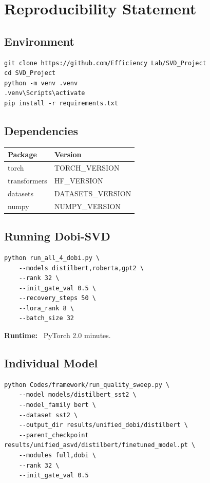
\section{Reproducibility Statement}

\subsection{Environment}

\begin{lstlisting}
git clone https://github.com/Efficiency Lab/SVD_Project
cd SVD_Project
python -m venv .venv
.venv\Scripts\activate
pip install -r requirements.txt
\end{lstlisting}

\subsection{Dependencies}

\begin{table}[H]
\centering
\small
\begin{tabular}{ll}
\toprule
\textbf{Package} & \textbf{Version} \\
\midrule
torch & {{TORCH\_VERSION}} \\
transformers & {{HF\_VERSION}} \\
datasets & {{DATASETS\_VERSION}} \\
numpy & {{NUMPY\_VERSION}} \\
\bottomrule
\end{tabular}
\end{table}

\subsection{Running Dobi-SVD}

\begin{lstlisting}
python run_all_4_dobi.py \
    --models distilbert,roberta,gpt2 \
    --rank 32 \
    --init_gate_val 0.5 \
    --recovery_steps 50 \
    --lora_rank 8 \
    --batch_size 32
\end{lstlisting}

\textbf{Runtime:} ~PyTorch 2.0 minutes.

\subsection{Individual Model}

\begin{lstlisting}
python Codes/framework/run_quality_sweep.py \
    --model models/distilbert_sst2 \
    --model_family bert \
    --dataset sst2 \
    --output_dir results/unified_dobi/distilbert \
    --parent_checkpoint results/unified_asvd/distilbert/finetuned_model.pt \
    --modules full,dobi \
    --rank 32 \
    --init_gate_val 0.5
\end{lstlisting}

